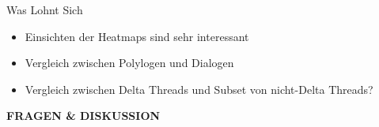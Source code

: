 \documentclass[compress,12pt]{beamer}
\begin{document}

    \begin{frame}{Was Lohnt Sich}
        \begin{itemize}
            \item Einsichten der Heatmaps sind sehr interessant
            \item Vergleich zwischen Polylogen und Dialogen
            \item Vergleich zwischen Delta Threads und Subset von nicht-Delta Threads?
        \end{itemize}
    \end{frame}

    \End

    \begin{frame}
        \centering
        \textbf{FRAGEN \& DISKUSSION}
    \end{frame}
\end{document}
